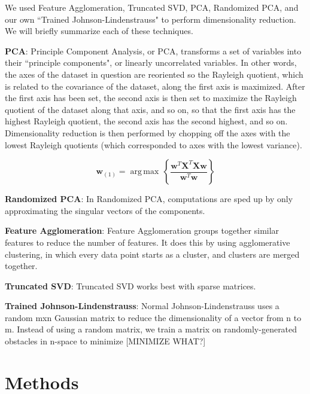 \documentclass[12pt]{article}
\begin{document}
We used Feature Agglomeration, Truncated SVD, PCA, Randomized PCA, and
our own ``Trained Johnson-Lindenstrauss" to perform dimensionality reduction. We will briefly summarize each of these techniques.

\textbf{PCA}: Principle Component Analysis, or PCA, transforms a set of variables into 
their ``principle components", or linearly uncorrelated variables. In other words, the axes of the dataset in question are reoriented so the Rayleigh quotient, which is related to the covariance of the dataset, along the first axis is maximized. After the first axis has been set, the second axis is then set to maximize the Rayleigh quotient of the dataset along that axis, and so on, so that the first axis has the highest Rayleigh quotient, the second axis has the second highest, and so on. Dimensionality reduction is then performed by chopping off the axes with the lowest Rayleigh quotients (which corresponded to axes with the lowest variance).

$$
\mathbf{w}_{(1)} = {\operatorname{\arg\,max}}\, \left\{ \frac{\mathbf{w}^T\mathbf{X}^T \mathbf{X w}}{\mathbf{w}^T \mathbf{w}} \right\}
$$


\textbf{Randomized PCA}: In Randomized PCA, computations are sped up by only approximating the singular vectors of the components.

\textbf{Feature Agglomeration}: Feature Agglomeration groups together similar features to reduce the number of features. It does this by using agglomerative clustering, in which every data point starts as a cluster, and clusters are merged together.

\textbf{Truncated SVD}: Truncated SVD works best with sparse matrices.

\textbf{Trained Johnson-Lindenstrauss}: Normal Johnson-Lindenstrauss uses a random mxn Gaussian matrix to reduce the dimensionality of a vector from n to m. Instead of using a random matrix, we train a matrix on randomly-generated obstacles in n-space to minimize [MINIMIZE WHAT?]

\section{Methods}
\end{document}
